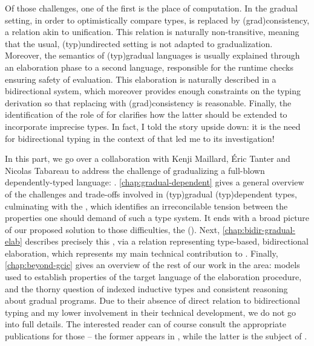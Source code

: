 Of those challenges, one of the first is the place of computation.
In the gradual setting, in order to optimistically compare types,
 is replaced by \kl(grad){consistency}, a relation
akin to unification. This relation is naturally
non-transitive, meaning that the usual, \kl(typ){undirected} setting is not adapted to
gradualization.%
Moreover, the semantics of \kl(typ){gradual} languages is usually explained
through an elaboration phase to a second language, responsible for the runtime checks ensuring
safety of evaluation. This elaboration is naturally described in a bidirectional
system, which moreover provides enough constraints on the typing derivation so that replacing
 with \kl(grad){consistency} is reasonable. Finally, the identification of
the role of  for  clarifies
how the latter should be extended to incorporate imprecise types.
In fact, I told the story upside down: it is the need for bidirectional typing in the context
of  that led me to its investigation!

In this part, we go over a collaboration with Kenji Maillard, Éric Tanter and Nicolas
Tabareau to address the challenge of gradualizing a full-blown dependently-typed language:
 .
\cref{chap:gradual-dependent} gives a general overview of the challenges and trade-offs
involved in \kl(typ){gradual} \kl(typ){dependent} types, culminating with the
, which identifies an irreconcilable tension between
the properties one should demand of such a type system. It ends with a broad picture
of our proposed solution to those difficulties,
the  ().
Next, \cref{chap:bidir-gradual-elab} describes precisely this ,
via a relation representing type-based, bidirectional elaboration,
which represents my main technical contribution to \textcite{LennonBertrand2022}.
Finally, \cref{chap:beyond-gcic} gives an overview of the rest of our work in the area:
models used to establish properties of the target language of the elaboration procedure,
and the thorny question of indexed inductive types and consistent reasoning about gradual
programs.
Due to their absence of direct relation to bidirectional typing and my lower
involvement in their technical development, we do not go into full details.
The interested reader can of course consult the appropriate publications for those –
the former appears in \textcite{LennonBertrand2022}, while the latter is the subject
of \textcite{Maillard2022}.